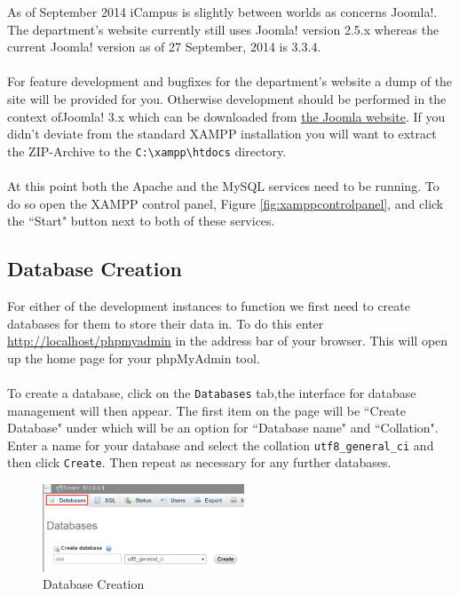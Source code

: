 \documentclass[]{report}
\begin{document}
\noindent
As of September 2014 iCampus is slightly between worlds as concerns Joomla!. The department's website currently still uses Joomla! version 2.5.x whereas the current Joomla! version as of 27 September, 2014 is 3.3.4.\\
\\
For feature development and bugfixes for the department's website a dump of the site will be provided for you. Otherwise development should be performed in the context ofJoomla! 3.x which can be downloaded from \href{http://www.joomla.org/download.html}{the Joomla website}. If you didn't deviate from the standard XAMPP installation you will want to extract the ZIP-Archive to the \texttt{C:\textbackslash xampp\textbackslash htdocs} directory.\\ 
\\
At this point both the Apache and the MySQL services need to be running. To do so open the XAMPP control panel, Figure \ref{fig:xamppcontrolpanel}, and click the ``Start" button next to both of these services.

\subsection{Database Creation}

For either of the development instances to function we first need to create databases for them to store their data in. To do this enter \url{http://localhost/phpmyadmin} in the address bar of your browser. This will open up the home page for your phpMyAdmin tool.\\
\\
To create a database, click on the \texttt{Databases} tab,the interface for database management will then appear. The first item on the page will be ``Create Database" under which will be an option for ``Database name" and ``Collation". Enter a name for your database and select the collation \texttt{utf8\_general\_ci} and then click \texttt{Create}. Then repeat as necessary for any further databases.\\

\begin{figure}[h] 
	\centering
	\includegraphics[width=6cm]{databasecreation.png}
	\caption{Database Creation}
	\label{fig:databasecreation}
\end{figure}
\end{document}
